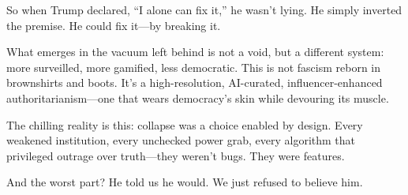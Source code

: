 \documentclass[12pt]{book}
\begin{document}
So when Trump declared, “I alone can fix it,” he wasn’t lying. He simply inverted the premise. He could fix it—by breaking it.

What emerges in the vacuum left behind is not a void, but a different system: more surveilled, more gamified, less democratic. This is not fascism reborn in brownshirts and boots. It’s a high-resolution, AI-curated, influencer-enhanced authoritarianism—one that wears democracy’s skin while devouring its muscle.

The chilling reality is this: collapse was a choice enabled by design. Every weakened institution, every unchecked power grab, every algorithm that privileged outrage over truth—they weren’t bugs. They were features.

And the worst part? He told us he would. We just refused to believe him.

\printbibliography
\end{document}
